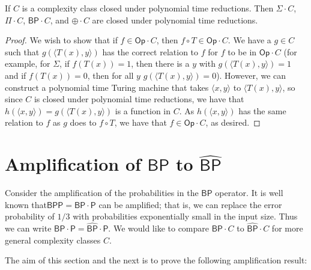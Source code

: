 \documentclass[11pt]{article}
\newcommand{\bp}{\textsf{BP}}
\newcommand{\strongbp}{\widehat{\textsf{BP}}}
\newcommand{\bpp}{\textsf{BPP}}
\newcommand{\parity}{\oplus}
\newcommand{\p}{\textsf{P}}
\newcommand{\op}{\textsf{Op}}
\begin{document}
\begin{lemma}
If $C$ is a complexity class closed under polynomial time reductions. Then $\Sigma \cdot C$, $\Pi\cdot C$, $\bp\cdot C$, and $\parity\cdot C$ are closed under polynomial time reductions.
\end{lemma}
\begin{proof}
We wish to show that if $f \in \op \cdot C$, then $f \circ T \in \op \cdot C$. We have a $g \in C$ such that $g(\langle T(x), y\rangle)$ has the correct relation to $f$ for $f$ to be in $\op \cdot C$ (for example, for $\Sigma$, if $f(T(x)) = 1$, then there is a $y$ with $g(\langle T(x), y\rangle) = 1$ and if $f(T(x)) = 0$, then for all $y$ $g(\langle T(x), y \rangle) = 0$). However, we can construct a polynomial time Turing machine that takes $\langle x, y\rangle$ to $\langle T(x), y\rangle$, so since $C$ is closed under polynomial time reductions, we have that $h(\langle x,y\rangle) = g(\langle T(x),y\rangle)$ is a function in $C$. As $h(\langle x,y\rangle)$ has the same relation to $f$ as $g$ does to $f \circ T$, we have that $f \in \op \cdot C$, as desired.
\end{proof}

\section{Amplification of $\bp$ to $\strongbp$\label{amplifysection}}

Consider the amplification of the probabilities in the $\bp$ operator. It is well known that\linebreak $\bpp = \bp \cdot \p$ can be amplified; that is, we can replace the error probability of $1/3$ with probabilities exponentially small in the input size. Thus we can write $\bp \cdot \p = \strongbp \cdot \p$. We would like to compare $\bp \cdot C$ to $\strongbp \cdot C$ for more general complexity classes $C$.

The aim of this section and the next is to prove the following amplification result:
\end{document}
